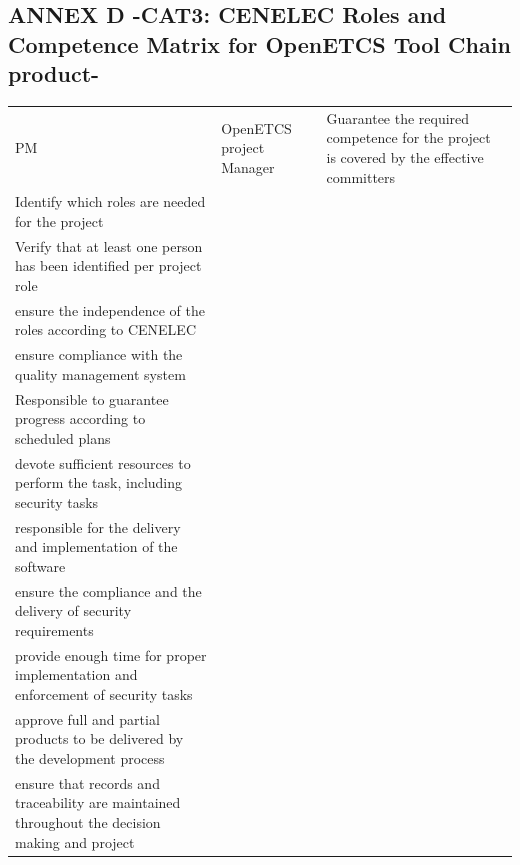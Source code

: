 \documentclass{template/openetcs_article}
\begin{document}
\begin{landscape}
\newpage


\subsection{ANNEX D -CAT3: CENELEC Roles and Competence Matrix for OpenETCS Tool Chain product-}

\begin{flushleft}
\begin{supertabular}[H]{|m{1cm}|m{2,5cm}|m{15,5cm}|m{6cm}|}
\hline
PM &
OpenETCS project Manager &
\raggedright
Guarantee the required competence for the project is covered by the effective committers\\
Identify which roles are needed for the project\\
Verify that at least one person has been identified per project role\\
ensure the independence of the roles according to CENELEC\\
ensure compliance with the quality management system\\
Responsible to guarantee progress according to scheduled plans\\
devote sufficient resources to perform the task, including security tasks\\
responsible for the delivery and implementation of the software\\
ensure the compliance and the delivery of security requirements\\
provide enough time for proper implementation and enforcement of security tasks\\
approve full and partial products to be delivered by the development process\\
ensure that records and traceability are maintained throughout the decision making and project\\

\end{supertabular}
\end{flushleft}
\end{landscape}
\end{document}
